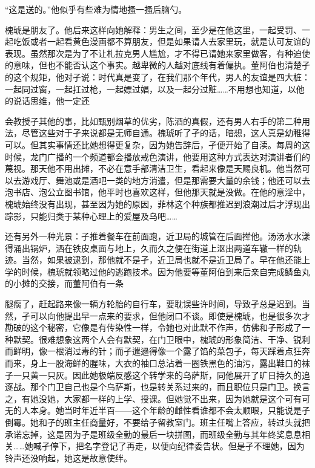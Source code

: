 \documentclass{article}
\begin{document}
“这是送的。”他似乎有些难为情地搔一搔后脑勺。

槐琥是朋友了。他后来这样向她解释：男生之间，至少是在他这里，一起受罚、一起吃饭或者一起看黄色漫画都不算朋友，但是如果请人去家里玩，就是认可友谊的表现。虽然那次是为了不让札拉克男人尴尬，才不得已请她来家里做客，有种迫使的意味，但也不能否认这个事实。越卑微的人越对底线有着偏执。董阿伯也清楚孑的这个规矩，他对孑说：时代真是变了，在我们那个年代，男人的友谊是四大桩：一起同过窗，一起扛过枪，一起嫖过娼，以及一起分过赃……不用想也知道，以他的说话思维，他一定还

\newpage 

会教授孑其他的事，比如甄别烟草的优劣，陈酒的真假，还有男人右手的第二种用法，尽管这些对于孑来说都是无师自通。槐琥听了孑的话，暗想，这人真是幼稚得可以。但其实事情还比她想得更复杂，因为她告辞后，孑便开始了自渎。每周的这时候，龙门广播的一个频道都会播放戒色演讲，他要用这种方式表达对演讲者们的蔑视。那天他不用出摊，不必在意手部清洁卫生，看起来像是天赐良机。他当然可以去游戏厅、舞池或是酒吧一类的地方消遣，但是那需要大量的余钱；他还可以去泡书店、泡公立图书馆，他平时也喜欢这样，但他那天就是没做。在他的意淫中，槐琥始终没有出现，甚至因为她的原因，菲林这个种族都推迟到浪潮过后才浮现出踪影，只能归类于某种心理上的爱屋及乌吧……

还有另外一种光景：孑推着餐车在前面跑，近卫局的城管在后面撵他。汤汤水水漾得涌出锅炉，洒在铁皮桌面与地上，久而久之便在街道上沤出两道车辙一样的轨迹。当然，如果被逮到，那他就不是孑，近卫局也就不是近卫局了。早在他还能上学的时候，槐琥就领略过他的逃跑技术。因为他要等董阿伯到来后亲自完成鳞鱼丸的小摊的交接，而董阿伯有一条

\newpage 

腿瘸了，赶起路来像一辆方轮胎的自行车，要耽误些许时间，导致孑总是迟到。当然，孑可以向他提出早一点来的要求，但他闭口不谈。即使是槐琥，也是很多次才勘破的这个秘密，它像是有传染性一样，令她也对此默不作声，仿佛和孑形成了一种默契。很难想象这两个人会有默契，在门卫眼中，槐琥的形象简洁、干净、锐利而鲜明，像一根消过毒的针；而孑邋遢得像一个露了馅的菜包子，每天踩着点狂奔而来，身上一股海鲜的腥味，大衣的袖口总沾着一圈铁黑色的油污，露出鞋口的袜子一只黄一只灰。因此她极端反感这个转学来的乌萨斯，同他展开了旷日持久的追逐战。那个门卫自己也是个乌萨斯，也是转关系过来的，而且职位只是门卫。换言之，有她没她，大家都一样的上学、授课。但她觉不出来，因为她就是这个可有可无的人本身。她当时年近半百——这个年龄的雌性看谁都不会太顺眼，只能说是孑倒霉。她和孑的班主任商量好，不要给孑留教室门。班主任嘴上答应，转过头就把承诺忘掉，这是因为孑是班级全勤的最后一块拼图，而班级全勤与其年终奖息息相关……她喊孑停下，把名字登记了再走，以便向纪律委告状。但是孑不理她，因为铃声还没响起，她这是故意使绊。
\end{document}
